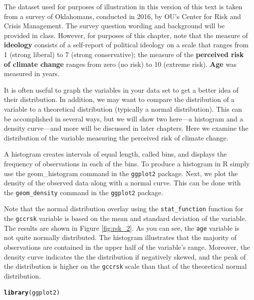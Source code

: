 \documentclass[11pt,openany]{book}
\makeatletter
\newcommand{\hlstd}[1]{\textcolor[rgb]{0.345,0.345,0.345}{#1}}%
\newcommand{\hlkwd}[1]{\textcolor[rgb]{0.737,0.353,0.396}{\textbf{#1}}}%
\newenvironment{kframe}{%
 \def\at@end@of@kframe{}%
 \ifinner\ifhmode%
  \def\at@end@of@kframe{\end{minipage}}%
  \begin{minipage}{\columnwidth}%
 \fi\fi%
 \def\FrameCommand##1{\hskip\@totalleftmargin \hskip-\fboxsep
 \colorbox{shadecolor}{##1}\hskip-\fboxsep
     \hskip-\linewidth \hskip-\@totalleftmargin \hskip\columnwidth}%
 \MakeFramed {\advance\hsize-\width
   \@totalleftmargin\z@ \linewidth\hsize
   \@setminipage}}%
 {\par\unskip\endMakeFramed%
 \at@end@of@kframe}
\newenvironment{knitrout}{}{} %
\renewenvironment{knitrout}{\begin{singlespace}}{\end{singlespace}}
\makeatother
\begin{document}
The dataset used for purposes of illustration in this version of this text is taken from a survey of Oklahomans, conducted in 2016, by OU's Center for Risk and Crisis Management. The survey question wording and background will be provided in class. However, for purposes of this chapter, note that the measure of  \textbf{ideology} consists of a self-report of political ideology on a scale that ranges from 1 (strong liberal) to 7 (strong conservative); the measure of the \textbf{perceived risk of climate change} ranges from zero (no risk) to 10 (extreme risk). \textbf{Age} was measured in years. 

It is often useful to graph the variables in your data set to get a better idea of their distribution. In addition, we may want to compare the distribution of a variable to a theoretical distribution (typically a normal distribution). This can be accomplished in several ways, but we will show two here---a histogram and a density curve---and more will be discussed in later chapters. Here we examine the distribution of the variable measuring the perceived risk of climate change. 

A histogram creates intervals of equal length, called bins, and displays the frequency of observations in each of the bins. To produce a histogram in R simply use the geom_histogram command in the \texttt{ggplot2} package. Next, we  plot the density of the observed data along with a normal curve.  This can be done with the \texttt{geom_density} command in the \texttt{ggplot2} package. 

Note that the normal distribution overlay using the \texttt{stat_function} function for the \texttt{gccrsk} variable is based on the mean and standard deviation of the  variable. The results are shown in Figure \ref{fig:rsk_2}. As you can see, the \texttt{age} variable is not quite normally distributed.  The histogram illustrates that the majority of observations are contained in the upper half of the variable's range.  Moreover, the density curve indicates the the distribution if negatively skewed, and the peak of the distribution is higher on the \texttt{gccrsk} scale than that of the theoretical normal distribution.


\begin{knitrout}
\color{fgcolor}\begin{kframe}
\begin{alltt}
\hlkwd{library}\hlstd{(ggplot2)}
\end{alltt}
\end{kframe}
\end{knitrout}
\end{document}
